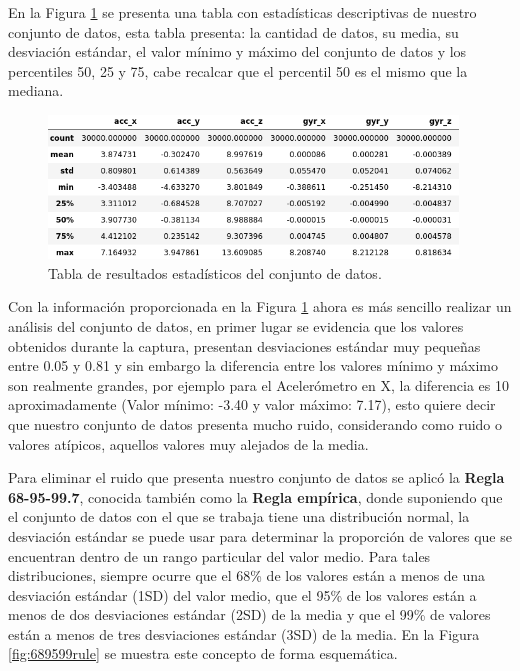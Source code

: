\vspace{5mm} %

En la Figura \ref{tab: est} se presenta una tabla con estad\'{i}sticas descriptivas de nuestro conjunto de datos, esta tabla presenta: la cantidad de datos, su media, su desviaci\'{o}n est\'{a}ndar, el valor m\'{i}nimo y m\'{a}ximo del conjunto de datos y los percentiles 50, 25 y 75, cabe recalcar que el percentil 50 es el mismo que la mediana.

\begin{figure}[h!]
  \begin{center}	\includegraphics[width=0.97\textwidth,frame]{imagenes/Cap3/describe_data}
  \caption{Tabla de resultados estad\'{i}sticos del conjunto de datos.}
  \label{tab: est}
  \end{center}
\end{figure}

\vspace{5mm} %

Con la informaci\'{o}n proporcionada en la Figura \ref{tab: est} ahora es m\'{a}s sencillo realizar un an\'{a}lisis del conjunto de datos, en primer lugar se evidencia que los valores obtenidos durante la captura, presentan desviaciones est\'{a}ndar muy peque\~{n}as entre 0.05 y 0.81 y sin embargo la diferencia entre los valores m\'{i}nimo y m\'{a}ximo son realmente grandes, por ejemplo para el Aceler\'{o}metro en X, la diferencia es 10 aproximadamente (Valor m\'{i}nimo: -3.40 y valor m\'{a}ximo: 7.17), esto quiere decir que nuestro conjunto de datos presenta mucho ruido, considerando como ruido o valores at\'{i}picos, aquellos valores muy alejados de la media. 

\vspace{5mm} %

Para eliminar el ruido que presenta nuestro conjunto de datos se aplic\'{o} la \textbf{Regla 68-95-99.7}, conocida tambi\'{e}n como la \textbf{Regla emp\'{i}rica}, donde suponiendo que el conjunto de datos con el que se trabaja tiene una distribuci\'{o}n normal, la desviaci\'{o}n est\'{a}ndar se puede usar para determinar la proporci\'{o}n de valores que se encuentran dentro de un rango particular del valor medio. Para tales distribuciones, siempre ocurre que el 68\% de los valores est\'{a}n a menos de una desviaci\'{o}n est\'{a}ndar (1SD) del valor medio, que el 95\% de los valores est\'{a}n a menos de dos desviaciones est\'{a}ndar (2SD) de la media y que el 99\% de valores est\'{a}n a menos de tres desviaciones est\'{a}ndar (3SD) de la media. En la Figura \ref{fig:689599rule} se muestra este concepto de forma esquem\'{a}tica.

